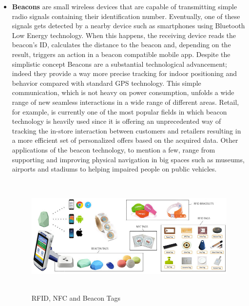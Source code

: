 \begin{itemize}
  \item \textbf{Beacons} are small wireless devices that are capable of transmitting simple radio signals containing their identification number. Eventually, one of these signals gets detected by a nearby device such as smartphones using Bluetooth Low Energy technology. When this happens, the receiving device reads the beacon's ID, calculates the distance to the beacon and, depending on the result, triggers an action in a beacon compatible mobile app. Despite the simplistic concept Beacons are a substantial technological advancement; indeed they provide a way more precise tracking for indoor positioning and behavior compared with standard GPS technology. This simple communication, which is not heavy on power consumption, unfolds a wide range of new seamless interactions in a wide range of different areas. Retail, for example, is currently one of the most popular fields in which beacon technology is heavily used since it is offering an unprecedented way of tracking the in-store interaction between customers and retailers resulting in a more efficient set of personalized offers based on the acquired data. Other applications of the beacon technology, to mention a few, range from supporting and improving physical navigation in big spaces such as museums, airports and stadiums to helping impaired people on public vehicles.

  \vspace{0.5cm}
  \begin{figure}[htbp]
    \centering
      \includegraphics[height=6cm]{images/iot-devices.jpg}
    \caption{RFID, NFC and Beacon Tags}
    \label{fig:devices}
  \end{figure}
  \vspace{0.5cm}


\end{itemize}
